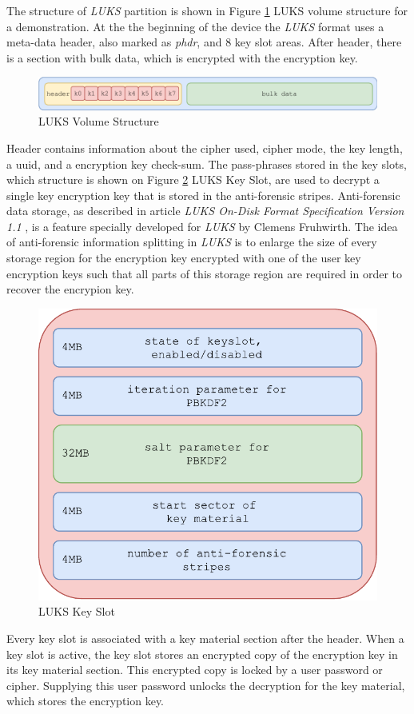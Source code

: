 The structure of {\it LUKS} partition is shown in Figure \ref{fig_luksvol} LUKS volume structure for a demonstration.
At the the beginning of the device the {\it LUKS} format uses a meta-data header, also marked as {\it phdr}, and 8 key slot areas.
After header, there is a section with bulk data, which is encrypted with the encryption key.
\begin{figure}[h]
    \centering
    \includegraphics[scale=0.7]{figures/LUKSdrive.pdf}
    \caption{LUKS Volume Structure}
    \label{fig_luksvol}
\end{figure}
Header contains information about the cipher used, cipher mode, the key length, a uuid, and a encryption key check-sum.
The pass-phrases stored in the key slots, which structure is shown on Figure \ref{fig_luksslot} LUKS Key Slot, are used to decrypt a single key encryption key that is stored in the anti-forensic stripes.
Anti-forensic data storage, as described in article {\it LUKS On-Disk Format Specification Version 1.1} \cite{fruhwirth2005luks}, is a feature specially developed for {\it LUKS} by Clemens Fruhwirth.
The idea of anti-forensic information splitting in {\it LUKS} is to enlarge the size of every storage region for the encryption key encrypted with one of the user key encryption keys such that all parts of this storage region are required in order to recover the encrypion key.

\begin{figure}[h]
    \centering
    \includegraphics[scale=0.6]{figures/LUKSkeyslot.pdf}
    \caption{LUKS Key Slot}
    \label{fig_luksslot}
\end{figure}
Every key slot is associated with a key material section after the header.
When a key slot is active, the key slot stores an encrypted copy of the encryption key in its key material section.
This encrypted copy is locked by a user password or cipher.
Supplying this user password unlocks the decryption for the key material, which stores the encryption key.



